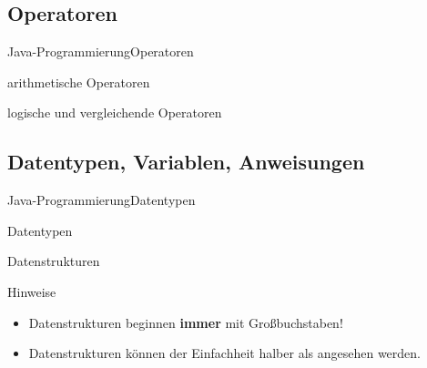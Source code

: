 
\subsection{Operatoren}
\begin{frame}{Java-Programmierung}{Operatoren}
    \begin{block}{arithmetische Operatoren}
        \centering{$\texttt{+, ++, --, +=, -=}$}
        \centering{$\texttt{*, /, \%, *=, /=, \%=}$}
    \end{block}
    \begin{block}{logische und vergleichende Operatoren}
        \centering{$\&\&, \mid\mid, <, <=, >, >=, !, !=$}
    \end{block}
\end{frame}

\subsection{Datentypen, Variablen, Anweisungen}
\begin{frame}[shrink]{Java-Programmierung}{Datentypen}
    \begin{block}{ Datentypen}
    \end{block}
    \begin{block}{Datenstrukturen}
    \end{block}
    \begin{exampleblock}{Hinweise}
        \begin{itemize}
            \item Datenstrukturen beginnen \textbf{immer} mit Großbuchstaben!
            \item Datenstrukturen können der Einfachheit halber als  angesehen werden. 
        \end{itemize}
    \end{exampleblock}
\end{frame}

